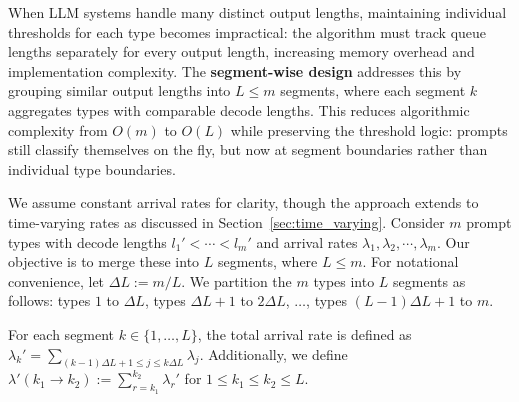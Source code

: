 When LLM systems handle many distinct output lengths, maintaining individual thresholds for each type becomes impractical: the algorithm must track queue lengths separately for every output length, increasing memory overhead and implementation complexity. The \textbf{segment-wise design} addresses this by grouping similar output lengths into $L \leq m$ segments, where each segment $k$ aggregates types with comparable decode lengths. This reduces algorithmic complexity from $O(m)$ to $O(L)$ while preserving the threshold logic: prompts still classify themselves on the fly, but now at segment boundaries rather than individual type boundaries.

We assume constant arrival rates for clarity, though the approach extends to time-varying rates as discussed in Section~\ref{sec:time_varying}. Consider $m$ prompt types with decode lengths $l_1' < \cdots < l_m'$ and arrival rates $\lambda_1, \lambda_2, \cdots, \lambda_m$. Our objective is to merge these into $L$ segments, where $L \leq m$. For notational convenience, let $\Delta L:= m/L$. We partition the $m$ types into $L$ segments as follows: types $1$ to $\Delta L$, types $\Delta L+ 1$ to $2\Delta L$, $\dots$, types $(L-1)\Delta L+ 1$ to $m$.

For each segment $k \in \{1, \dots, L\}$, the total arrival rate is defined as $\lambda_k' = \sum_{(k-1)\Delta L+1\le j\le k\Delta L} \lambda_j$. Additionally, we define $\lambda'(k_1 \to k_2) := \sum_{r=k_1}^{k_2} \lambda_r'$ for $1 \leq k_1 \leq k_2 \leq L$.

